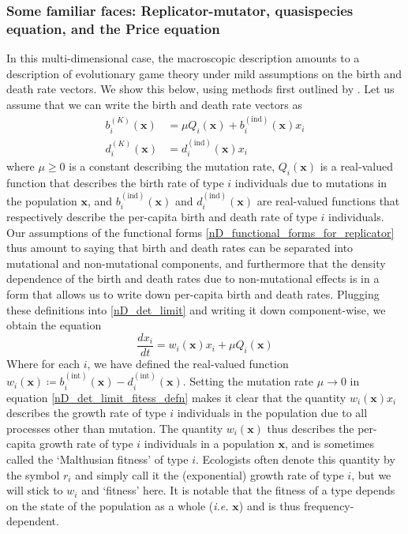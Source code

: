 \subsubsection{Some familiar faces: Replicator-mutator, quasispecies equation, and the Price equation}
In this multi-dimensional case, the macroscopic description amounts to a description of evolutionary game theory under mild assumptions on the birth and death rate vectors. We show this below, using methods first outlined by \citep{page_unifying_2002}. Let us assume that we can write the birth and death rate vectors as
\begin{equation}
\label{nD_functional_forms_for_replicator}
\begin{aligned}
b^{(K)}_i(\mathbf{x}) &= \mu Q_i(\mathbf{x}) + b^{(\textrm{ind})}_{i}(\mathbf{x})x_i\\
d^{(K)}_i(\mathbf{x}) &= d^{(\textrm{ind})}_i(\mathbf{x})x_i
\end{aligned}
\end{equation}
where $\mu \geq 0$ is a constant describing the mutation rate, $Q_i(\mathbf{x})$ is a real-valued function that describes the birth rate of type $i$ individuals due to mutations in the population $\mathbf{x}$, and $b^{(\textrm{ind})}_{i}(\mathbf{x})$ and $d^{(\textrm{ind})}_{i}(\mathbf{x})$ are real-valued functions that respectively describe the per-capita birth and death rate of type $i$ individuals. Our assumptions of the functional forms \eqref{nD_functional_forms_for_replicator} thus amount to saying that birth and death rates can be separated into mutational and non-mutational components, and furthermore that the density dependence of the birth and death rates due to non-mutational effects is in a form that allows us to write down per-capita birth and death rates. Plugging these definitions into \eqref{nD_det_limit} and writing it down component-wise, we obtain the equation
\begin{equation}
\label{nD_det_limit_fitess_defn}
\frac{dx_i}{dt} = w_i(\mathbf{x})x_i + \mu Q_i(\mathbf{x})
\end{equation}
Where for each $i$, we have defined the real-valued function $w_i(\mathbf{x}) \coloneqq b^{(\textrm{int})}_{i}(\mathbf{x}) - d^{(\textrm{int})}_i(\mathbf{x})$. Setting the mutation rate $\mu \to 0$ in equation \eqref{nD_det_limit_fitess_defn} makes it clear that the quantity $w_i(\mathbf{x})x_i$ describes the growth rate of type $i$ individuals in the population due to all processes other than mutation. The quantity $w_i(\mathbf{x})$ thus describes the per-capita growth rate of type $i$ individuals in a population $\mathbf{x}$, and is sometimes called the `Malthusian fitness' of type $i$. Ecologists often denote this quantity by the symbol $r_i$ and simply call it the (exponential) growth rate of type $i$, but we will stick to $w_i$ and `fitness' here. It is notable that the fitness of a type depends on the state of the population as a whole (\textit{i.e.} $\mathbf{x}$) and is thus frequency-dependent.\\
